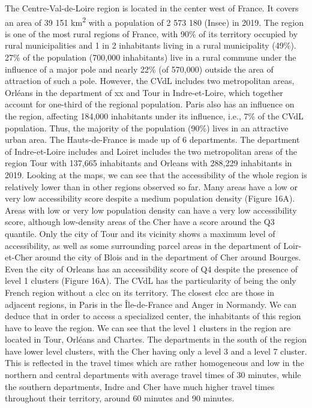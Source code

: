 The Centre-Val-de-Loire region is located in the center west of France. It covers an area of 39 151 km\textsuperscript{2} with a population of 2 573 180 (Insee) in 2019.
The region is one of the most rural regions of France, with 90\% of its territory occupied by rural municipalities and 1 in 2 inhabitants living in a rural municipality (49\%). 27\% of the population (700,000 inhabitants) live in a rural commune under the influence of a major pole and nearly 22\% (of 570,000) outside the area of attraction of such a pole.
However, the CVdL includes two metropolitan areas, Orléans in the department of xx and Tour in Indre-et-Loire, which together account for one-third of the regional population. Paris also has an influence on the region, affecting 184,000 inhabitants under its influence, i.e., 7\% of the CVdL population. Thus, the majority of the population (90\%) lives in an attractive urban area. The Hauts-de-France is made up of 6 departments. The department of Indre-et-Loire includes and Loiret includes the two metropolitan areas of the region Tour with 137,665 inhabitants and Orleans with 288,229 inhabitants in 2019. Looking at the maps, we can see that the accessibility of the whole region is relatively lower than in other regions observed so far. Many areas have a low or very low accessibility score despite a medium population density (Figure 16A). Areas with low or very low population density can have a very low accessibility score, although low-density areas of the Cher have a score around the Q3 quantile. Only the city of Tour and its vicinity shows a maximum level of accessibility, as well as some surrounding parcel areas in the department of Loir-et-Cher around the city of Blois and in the department of Cher around Bourges. Even the city of Orleans has an accessibility score of Q4 despite the presence of level 1 clusters (Figure 16A). The CVdL has the particularity of being the only French region without a \ac{clcc} on its territory. The closest \ac{clcc} are those in adjacent regions, in Paris in the Île-de-France and Anger in Normandy. We can deduce that in order to access a specialized center, the inhabitants of this region have to leave the region.  We can see that the level 1 clusters in the region are located in Tour, Orléans and Chartes. The departments in the south of the region have lower level clusters, with the Cher having only a level 3 and a level 7 cluster. This is reflected in the travel times which are rather homogeneous and low in the northern and central departments with average travel times of 30 minutes, while the southern departments, Indre and Cher have much higher travel times throughout their territory, around 60 minutes and 90 minutes.

